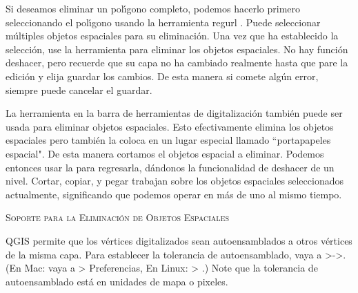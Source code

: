 
Si deseamos eliminar un pol\'{\i}gono completo, podemos hacerlo primero seleccionando 
el pol\'{\i}gono usando la herramienta regurl . Puede seleccionar 
m\'ultiples objetos espaciales para su eliminaci\'on. Una vez que ha establecido la selecci\'on, use la 
herramienta  para eliminar los objetos espaciales. No hay funci\'on deshacer, 
pero recuerde que su capa no ha cambiado realmente hasta que pare la edici\'on y elija 
guardar los cambios. De esta manera si comete alg\'un error, siempre puede cancelar el guardar.

La herramienta  en la barra de herramientas de digitalizaci\'on también puede
ser usada para eliminar objetos espaciales. Esto efectivamente elimina los objetos espaciales pero
también la coloca en un lugar especial llamado ``portapapeles espacial". De esta manera cortamos el objetos espacial a eliminar. 
Podemos entonces usar la  para regresarla, d\'andonos la funcionalidad de deshacer de un nivel. 
Cortar, copiar, y pegar trabajan sobre los objetos espaciales seleccionados actualmente, 
significando que podemos operar en más de uno al mismo tiempo.

\begin{Tip}[ht]\caption{\textsc{Soporte para la Eliminaci\'on de Objetos Espaciales}}
\end{Tip}

QGIS permite que los v\'ertices digitalizados sean autoensamblados a otros v\'ertices de la misma capa. Para 
establecer la tolerancia de autoensamblado, vaya a
>->.
(En Mac: vaya a   > Preferencias, En Linux:  > .)
Note que la tolerancia de autoensamblado est\'a en unidades de mapa o pixeles.


